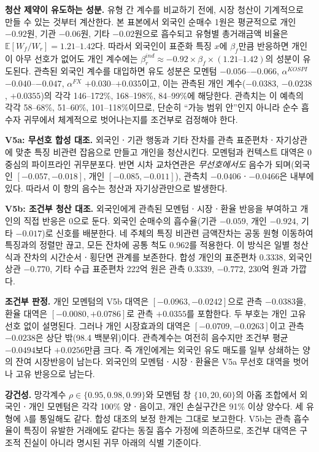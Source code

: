 \textbf{청산 제약이 유도하는 성분.} 유형 간 계수를 비교하기 전에, 시장 청산이 기계적으로
만들 수 있는 것부터 계산한다. 본 표본에서 외국인 순매수 1원은 평균적으로 개인 $-0.92$원,
기관 $-0.06$원, 기타 $-0.02$원으로 흡수되고 유형별 총거래금액 비율은
$\mathbb{E}[W_f/W_r]=1.21$--$1.42$다. 따라서 외국인이 표준화 특징 $x$에 $\beta_f$만큼
반응하면 개인이 아무 선호가 없어도 개인 계수에는
$\beta^{ind}_{r}\approx-0.92\times\beta_f\times(1.21\text{--}1.42)$의 성분이 유도된다.
관측된 외국인 계수를 대입하면 유도 성분은 모멘텀 $-0.056$--$-0.066$,
$\alpha^{KOSPI}$ $-0.040$--$-0.047$, $\alpha^{FX}$ $+0.030$--$+0.035$이고, 이는 관측된 개인
계수($-0.0383$, $-0.0238$, $+0.0355$)의 각각 146--172\%, 168--198\%, 84--99\%에 해당한다.
관측치는 이 예측의 각각 58--68\%, 51--60\%, 101--118\%이므로, 단순히 ``가능 범위 안''인지
아니라 순수 흡수자 귀무에서 체계적으로 벗어나는지를 조건부로 검정해야 한다.

\textbf{V5a: 무선호 합성 대조.} 외국인ㆍ기관 행동과 기타 잔차를 관측 표준편차ㆍ자기상관에
맞춘 특징 비관련 잡음으로 만들고 개인을 청산시킨다. 모멘텀과 컨텍스트 대역은 0 중심의
파이프라인 귀무분포다. 반면 시차 교차연관은 \emph{무선호에서도} 음수가 되며(외국인
$[-0.057,-0.018]$, 개인 $[-0.085,-0.011]$), 관측치 $-0.0406$ㆍ$-0.0466$은 내부에 있다.
따라서 이 항의 음수는 청산과 자기상관만으로 발생한다.

\textbf{V5b: 조건부 청산 대조.} 외국인에게 관측된 모멘텀ㆍ시장ㆍ환율 반응을 부여하고
개인의 직접 반응은 0으로 둔다. 외국인 순매수의 흡수율(기관 $-0.059$, 개인 $-0.924$,
기타 $-0.017$)로 신호를 배분한다. 네 주체의 특징 비관련 금액잔차는 공동 원형 이동하여
특징과의 정렬만 끊고, 모든 잔차에 공통 척도 0.962를 적용한다. 이 방식은 일별 청산식과
잔차의 시간순서ㆍ횡단면 관계를 보존한다. 합성 개인의 표준편차 $0.3338$, 외국인 상관
$-0.770$, 기타 수급 표준편차 222억 원은 관측 $0.3339$, $-0.772$, 230억 원과 가깝다.

\textbf{조건부 판정.} 개인 모멘텀의 V5b 대역은 $[-0.0963,-0.0242]$으로 관측 $-0.0383$을,
환율 대역은 $[-0.0080,+0.0786]$로 관측 $+0.0355$를 포함한다. 두 부호는 개인 고유 선호
없이 설명된다. 그러나 개인 시장효과의 대역은 $[-0.0709,-0.0263]$이고 관측 $-0.0238$은
상단 밖(98.4 백분위)이다. 관측계수는 여전히 음수지만 조건부 평균 $-0.0494$보다
$+0.0256$만큼 크다. 즉 개인에게는 외국인 유도 매도를 일부 상쇄하는 양의 잔여 시장반응이
남는다. 외국인의 모멘텀ㆍ시장ㆍ환율은 V5a 무선호 대역을 벗어나 고유 반응으로 남는다.

\textbf{강건성.} 망각계수 $\rho\in\{0.95,0.98,0.99\}$와 모멘텀 창
$\{10,20,60\}$의 아홉 조합에서 외국인ㆍ개인 모멘텀은 각각 100\% 양ㆍ음이고,
개인 손실구간은 91\% 이상 양수다. 세 유형에 $\lambda$를 통일해도 같다. 합성 대조의 보정 한계는 그대로
보고한다. V5b는 관측 흡수율이 특징이 유발한 거래에도 같다는 동질 흡수 가정에 의존하므로,
조건부 대역은 구조적 진실이 아니라 명시된 귀무 아래의 식별 기준이다.

